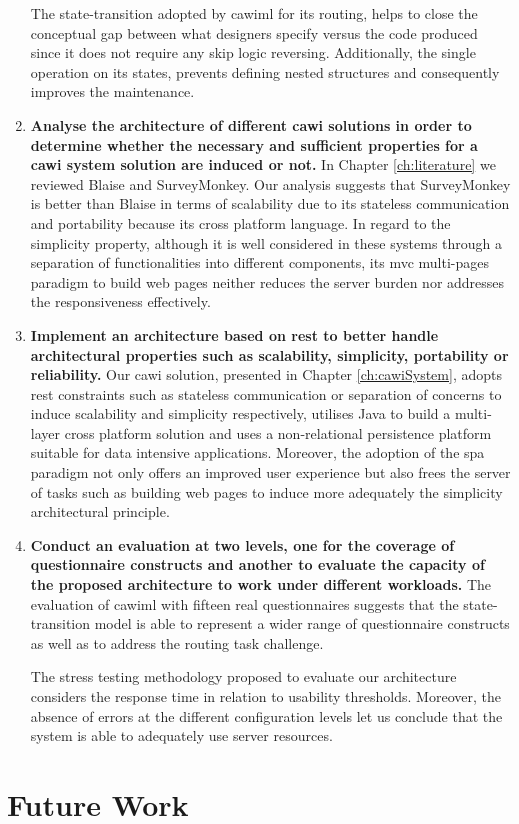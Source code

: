\begin{enumerate}
			The state-transition adopted by \gls{cawiml} for its routing, helps to close the conceptual gap between what designers specify versus the code produced since it does not require any skip logic reversing. Additionally, the single operation on its states, prevents defining nested structures and consequently improves the maintenance.

			\item \textbf{Analyse the architecture of different \gls{cawi} solutions in order to determine whether the necessary and sufficient properties for a \gls{cawi} system solution are induced or not.} In Chapter \ref{ch:literature} we reviewed Blaise and SurveyMonkey. Our analysis suggests that SurveyMonkey is better than Blaise in terms of scalability due to its stateless communication and portability because its cross platform language. In regard to the simplicity property, although it is well considered in these systems through a separation of functionalities into different components, its \gls{mvc} multi-pages paradigm to build web pages neither reduces the server burden nor addresses the responsiveness effectively.

			\item \textbf{Implement an architecture based on \gls{rest} to better handle architectural properties such as scalability, simplicity, portability or reliability.} Our \gls{cawi} solution, presented in Chapter \ref{ch:cawiSystem}, adopts \gls{rest} constraints such as stateless communication or separation of concerns to induce scalability and simplicity respectively, utilises Java to build a multi-layer cross platform solution and uses a non-relational persistence platform suitable for data intensive applications. Moreover, the adoption of the \gls{spa} paradigm not only offers an improved user experience but also frees the server of tasks such as building web pages to induce more adequately the simplicity architectural principle.

			\item \textbf{Conduct an evaluation at two levels, one for the coverage of questionnaire constructs and another to evaluate the capacity of the proposed architecture to work under different workloads.} The evaluation of \gls{cawiml} with fifteen real questionnaires suggests that the state-transition model is able to represent a wider range of questionnaire constructs as well as to address the routing task challenge.

			The stress testing methodology proposed to evaluate our architecture considers the response time in relation to usability thresholds. Moreover, the absence of errors at the different configuration levels let us conclude that the system is able to adequately use server resources.
		\end{enumerate}

	\section{Future Work}\label{sec:conclusion:futureWork}
		

	
